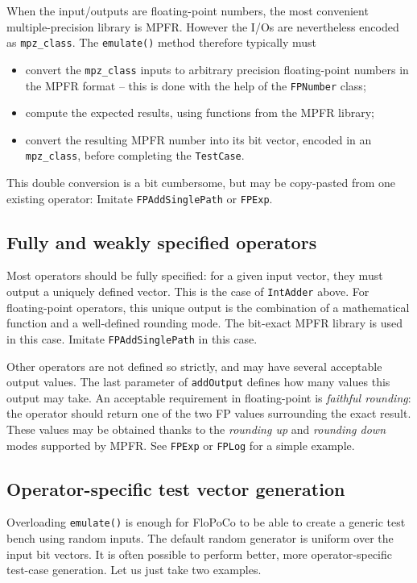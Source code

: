 \documentclass{article}
\begin{document}
When the input/outputs are floating-point numbers, the most convenient multiple-precision library is MPFR.
However the I/Os  are nevertheless encoded as \texttt{\small mpz\_class}.
The \texttt{\small emulate()} method therefore typically must
\begin{itemize}
\item convert the \texttt{\small mpz\_class} inputs to arbitrary precision floating-point numbers in the MPFR format -- this is done with the help of the \texttt{\small FPNumber} class;
\item compute the expected results, using functions from the MPFR library;
\item convert the resulting MPFR number into its bit vector, encoded in an \texttt{\small mpz\_class}, before completing the \texttt{\small TestCase}. 
\end{itemize}
This double conversion is a bit cumbersome, but may be copy-pasted from one existing operator: Imitate \texttt{\small FPAddSinglePath} or \texttt{\small FPExp}.


\subsection{Fully and weakly specified operators}
 Most operators should be fully specified: for a given input
  vector, they must output a uniquely defined vector. This is the case of 
  \texttt{\small IntAdder} above. For floating-point
  operators, this unique output is the combination of a mathematical
  function and a well-defined rounding mode. The bit-exact MPFR
  library is used in this case. Imitate \texttt{\small FPAddSinglePath} in this case.

 Other operators are not defined so strictly, and may have
  several acceptable output values. The last parameter of \texttt{\small addOutput}
  defines how many values this output may take. An acceptable
  requirement in floating-point is \emph{faithful rounding}: the
  operator should return one of the two FP values surrounding the
  exact result. These values may be obtained thanks to the
  \emph{rounding up} and \emph{rounding down} modes supported by
  MPFR. See \texttt{\small FPExp} or \texttt{\small FPLog} for a simple example.


\subsection{Operator-specific test  vector generation}
Overloading \texttt{\small emulate()} is enough for FloPoCo to be able
to create a generic test bench using random inputs. The default random generator is uniform over the input bit vectors. It is
often possible to perform better, more operator-specific test-case
generation. Let us just take two examples.
\end{document}
